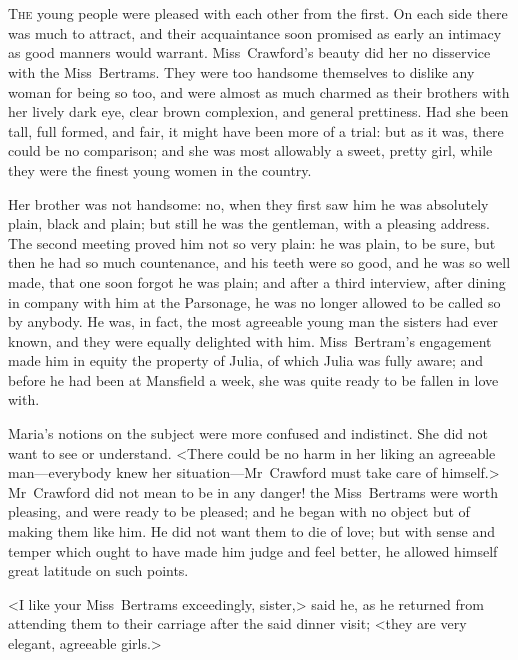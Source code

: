 \chapter[Chapter \thechapter]{} 

 \lettrine[lraise=0.3]{T}{he} young people were pleased with each other from the first. On each side there was much to attract, and their acquaintance soon promised as early an intimacy as good manners would warrant. Miss~Crawford's beauty did her no disservice with the Miss~Bertrams. They were too handsome themselves to dislike any woman for being so too, and were almost as much charmed as their brothers with her lively dark eye, clear brown complexion, and general prettiness. Had she been tall, full formed, and fair, it might have been more of a trial: but as it was, there could be no comparison; and she was most allowably a sweet, pretty girl, while they were the finest young women in the country.

Her brother was not handsome: no, when they first saw him he was absolutely plain, black and plain; but still he was the gentleman, with a pleasing address. The second meeting proved him not so very plain: he was plain, to be sure, but then he had so much countenance, and his teeth were so good, and he was so well made, that one soon forgot he was plain; and after a third interview, after dining in company with him at the Parsonage, he was no longer allowed to be called so by anybody. He was, in fact, the most agreeable young man the sisters had ever known, and they were equally delighted with him. Miss~Bertram's engagement made him in equity the property of Julia, of which Julia was fully aware; and before he had been at Mansfield a week, she was quite ready to be fallen in love with.

Maria's notions on the subject were more confused and indistinct. She did not want to see or understand. <There could be no harm in her liking an agreeable man—everybody knew her situation—Mr~Crawford must take care of himself.> Mr~Crawford did not mean to be in any danger! the Miss~Bertrams were worth pleasing, and were ready to be pleased; and he began with no object but of making them like him. He did not want them to die of love; but with sense and temper which ought to have made him judge and feel better, he allowed himself great latitude on such points.

<I like your Miss~Bertrams exceedingly, sister,> said he, as he returned from attending them to their carriage after the said dinner visit; <they are very elegant, agreeable girls.>

